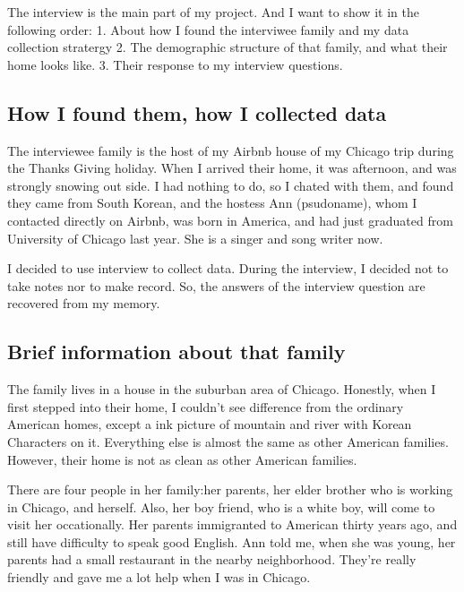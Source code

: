 The interview is the main part of my project. And I want to show it in the
following order: 1. About how I found the interviwee family and my data
collection stratergy 2. The demographic structure of that family, and what their
home looks like. 3. Their response to my interview questions.
\subsection{How I found them, how I collected data}
The interviewee family is the host of my Airbnb house of my Chicago trip during
the Thanks Giving holiday. When I arrived their home, it was afternoon, and was
strongly snowing out side. I had nothing to do, so I chated with them, and found
they came from South Korean, and the hostess Ann (psudoname), whom I contacted
directly on Airbnb, was born in America, and had just graduated from 
University of Chicago last year. She is a singer and song writer now.
\par
I decided to use interview to collect data. During the interview, I decided not
to take notes nor to make record. So, the answers of the interview question are
recovered from my memory. 
\subsection{Brief information about that family}
The family lives in a house in the suburban area of Chicago. Honestly, when I
first stepped into their home, I couldn't see difference from the ordinary
American homes, except a ink picture of mountain and river with Korean
Characters on it. Everything else is almost the same as other American
families. However, their home is not as clean as other American families. 
\par
There are four people in her family:her parents, her elder brother who is
working in Chicago, and herself. Also, her boy friend, who is a white boy, will
come to visit her occationally. Her parents immigranted to American thirty years
ago, and still have difficulty to speak good English. Ann told
me, when she was young, her parents had a small restaurant in the nearby
neighborhood. They're really friendly and gave me a lot help when I was in
Chicago.
